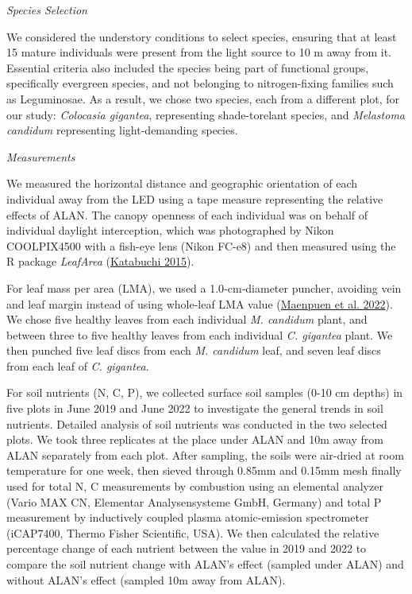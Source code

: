 \documentclass[
  12pt,
  letterpaper,
  DIV=11,
  numbers=noendperiod]{scrartcl}
\begin{document}
\emph{Species Selection}

We considered the understory conditions to select species, ensuring that
at least 15 mature individuals were present from the light source to 10
m away from it. Essential criteria also included the species being part
of functional groups, specifically evergreen species, and not belonging
to nitrogen-fixing families such as Leguminosae. As a result, we chose
two species, each from a different plot, for our study: \emph{Colocasia
gigantea}, representing shade-torelant species, and \emph{Melastoma
candidum} representing light-demanding species.

\emph{Measurements}

We measured the horizontal distance and geographic orientation of each
individual away from the LED using a tape measure representing the
relative effects of ALAN. The canopy openness of each individual was on
behalf of individual daylight interception, which was photographed by
Nikon COOLPIX4500 with a fish-eye lens (Nikon FC-e8) and then measured
using the R package \emph{LeafArea}
(\protect\hyperlink{ref-Katabuchi2015}{Katabuchi 2015}).

For leaf mass per area (LMA), we used a 1.0‐cm‐diameter puncher,
avoiding vein and leaf margin instead of using whole-leaf LMA value
(\protect\hyperlink{ref-Maenpuen2022}{Maenpuen et al. 2022}). We chose
five healthy leaves from each individual \emph{M. candidum} plant, and
between three to five healthy leaves from each individual \emph{C.
gigantea} plant. We then punched five leaf discs from each \emph{M.
candidum} leaf, and seven leaf discs from each leaf of \emph{C.
gigantea}.

For soil nutrients (N, C, P), we collected surface soil samples (0-10 cm
depths) in five plots in June 2019 and June 2022 to investigate the
general trends in soil nutrients. Detailed analysis of soil nutrients
was conducted in the two selected plots. We took three replicates at the
place under ALAN and 10m away from ALAN separately from each plot. After
sampling, the soils were air-dried at room temperature for one week,
then sieved through 0.85mm and 0.15mm mesh finally used for total N, C
measurements by combustion using an elemental analyzer (Vario MAX CN,
Elementar Analysensysteme GmbH, Germany) and total P measurement by
inductively coupled plasma atomic-emission spectrometer (iCAP7400,
Thermo Fisher Scientific, USA). We then calculated the relative
percentage change of each nutrient between the value in 2019 and 2022 to
compare the soil nutrient change with ALAN's effect (sampled under ALAN)
and without ALAN's effect (sampled 10m away from ALAN).
\end{document}
